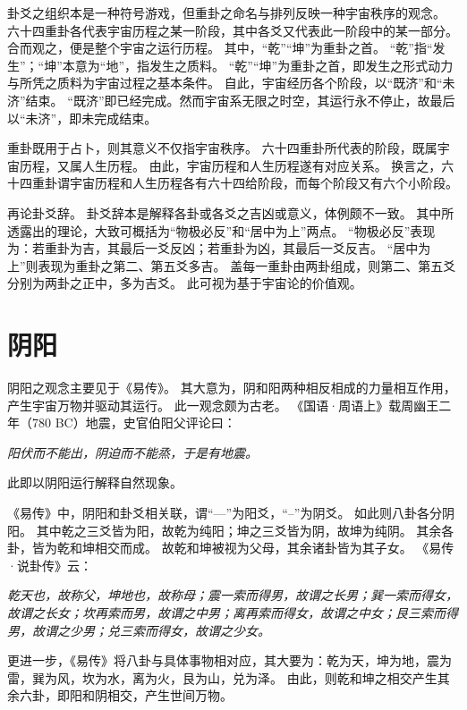\documentclass[11pt]{article}
\begin{document}
卦爻之组织本是一种符号游戏，但重卦之命名与排列反映一种宇宙秩序的观念。
六十四重卦各代表宇宙历程之某一阶段，其中各爻又代表此一阶段中的某一部分。
合而观之，便是整个宇宙之运行历程。
其中，“乾”“坤”为重卦之首。
“乾”指“发生”；“坤”本意为“地”，指发生之质料。
“乾”“坤”为重卦之首，即发生之形式动力与所凭之质料为宇宙过程之基本条件。
自此，宇宙经历各个阶段，以“既济”和“未济”结束。
“既济”即已经完成。然而宇宙系无限之时空，其运行永不停止，故最后以“未济”，即未完成结束。

\newline

重卦既用于占卜，则其意义不仅指宇宙秩序。
六十四重卦所代表的阶段，既属宇宙历程，又属人生历程。
由此，宇宙历程和人生历程遂有对应关系。
换言之，六十四重卦谓宇宙历程和人生历程各有六十四给阶段，而每个阶段又有六个小阶段。

\newline

再论卦爻辞。
卦爻辞本是解释各卦或各爻之吉凶或意义，体例颇不一致。
其中所透露出的理论，大致可概括为“物极必反”和“居中为上”两点。
“物极必反”表现为：若重卦为吉，其最后一爻反凶；若重卦为凶，其最后一爻反吉。
“居中为上”则表现为重卦之第二、第五爻多吉。
盖每一重卦由两卦组成，则第二、第五爻分别为两卦之正中，多为吉爻。
此可视为基于宇宙论的价值观。
  
\section{阴阳}
阴阳之观念主要见于《易传》。
其大意为，阴和阳两种相反相成的力量相互作用，产生宇宙万物并驱动其运行。
此一观念颇为古老。
《国语·周语上》载周幽王二年（780 BC）地震，史官伯阳父评论曰：

\textit{阳伏而不能出，阴迫而不能烝，于是有地震。}

此即以阴阳运行解释自然现象。

\newline

《易传》中，阴阳和卦爻相关联，谓“—”为阳爻，“--”为阴爻。
如此则八卦各分阴阳。
其中乾之三爻皆为阳，故乾为纯阳；坤之三爻皆为阴，故坤为纯阴。
其余各卦，皆为乾和坤相交而成。
故乾和坤被视为父母，其余诸卦皆为其子女。
《易传·说卦传》云：

\textit{乾天也，故称父，坤地也，故称母；震一索而得男，故谓之长男；巽一索而得女，故谓之长女；坎再索而男，故谓之中男；离再索而得女，故谓之中女；艮三索而得男，故谓之少男；兑三索而得女，故谓之少女。}

更进一步，《易传》将八卦与具体事物相对应，其大要为：乾为天，坤为地，震为雷，巽为风，坎为水，离为火，艮为山，兑为泽。
由此，则乾和坤之相交产生其余六卦，即阳和阴相交，产生世间万物。
  
\end{document}
